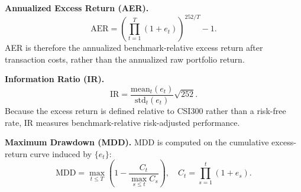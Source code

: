 \textbf{Annualized Excess Return (AER).}
\begin{equation}
\mathrm{AER}=\left(\prod_{t=1}^{T}(1+e_t)\right)^{252/T}-1.
\end{equation}
AER is therefore the annualized benchmark-relative excess return after transaction costs, rather than the annualized raw portfolio return.

\textbf{Information Ratio (IR).}
\begin{equation}
\mathrm{IR}=\frac{\mathrm{mean}_t(e_t)}{\mathrm{std}_t(e_t)}\sqrt{252}.
\end{equation}
Because the excess return is defined relative to CSI300 rather than a risk-free rate, IR measures benchmark-relative risk-adjusted performance.

\textbf{Maximum Drawdown (MDD).}
MDD is computed on the cumulative excess-return curve induced by \(\{e_t\}\):
\begin{equation}
\mathrm{MDD}=\max_{t\leq T}\left(1-\frac{C_t}{\max_{s\leq t}C_s}\right),
\quad
C_t=\prod_{s=1}^{t}(1+e_s).
\end{equation}




